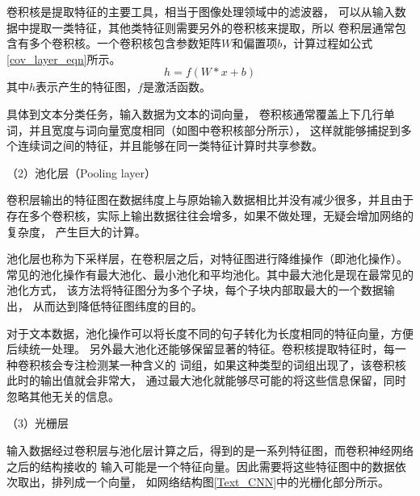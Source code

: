 卷积核是提取特征的主要工具，相当于图像处理领域中的滤波器，
可以从输入数据中提取一类特征，其他类特征则需要另外的卷积核来提取，所以
卷积层通常包含有多个卷积核。一个卷积核包含参数矩阵$W$和偏置项$b$，计算过程如公式\ref{cov_layer_eqn}所示。
\begin{equation}
    h=f\left ( W\ast x+b \right )
    \label{cov_layer_eqn}
\end{equation}
其中$h$表示产生的特征图，$f$是激活函数。

具体到文本分类任务，输入数据为文本的词向量，
卷积核通常覆盖上下几行单词，并且宽度与词向量宽度相同（如图中卷积核部分所示），
这样就能够捕捉到多个连续词之间的特征，并且能够在同一类特征计算时共享参数。

（2）池化层（Pooling layer）

卷积层输出的特征图在数据纬度上与原始输入数据相比并没有减少很多，并且由于
存在多个卷积核，实际上输出数据往往会增多，如果不做处理，无疑会增加网络的复杂度，
产生巨大的计算。

池化层也称为下采样层，在卷积层之后，对特征图进行降维操作（即池化操作）。
常见的池化操作有最大池化、最小池化和平均池化。其中最大池化是现在最常见的池化方式，
该方法将特征图分为多个子块，每个子块内部取最大的一个数据输出，
从而达到降低特征图纬度的目的。

对于文本数据，池化操作可以将长度不同的句子转化为长度相同的特征向量，方便后续统一处理。
另外最大池化还能够保留显著的特征。卷积核提取特征时，每一种卷积核会专注检测某一种含义的
词组，如果这种类型的词组出现了，该卷积核此时的输出值就会非常大，
通过最大池化就能够尽可能的将这些信息保留，同时忽略其他无关的信息。

（3）光栅层

输入数据经过卷积层与池化层计算之后，得到的是一系列特征图，而卷积神经网络之后的结构接收的
输入可能是一个特征向量。因此需要将这些特征图中的数据依次取出，排列成一个向量，
如网络结构图\ref{Text_CNN}中的光栅化部分所示。
